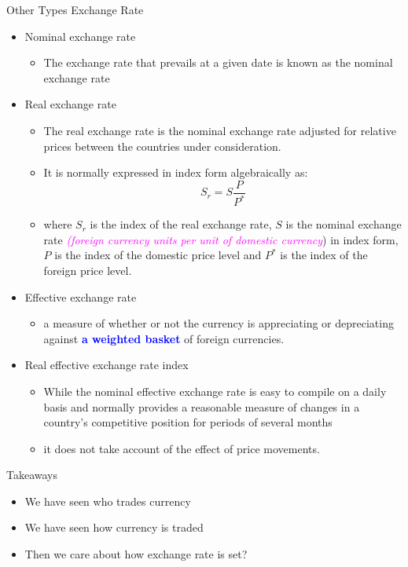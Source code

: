 \documentclass[10pt,hyperref={CJKbookmarks=true},xcolor=dvipsnames,aspectratio=169]{beamer}
\begin{document}
\begin{frame}[allowframebreaks]{Other Types Exchange Rate}

\begin{itemize}
	
	\item Nominal exchange rate
	
	\begin{itemize}
		\item The exchange rate that prevails at a given date is known as the nominal
		exchange rate
	\end{itemize}
	\item Real exchange rate
	
	\begin{itemize}
		\item The real exchange rate is the nominal exchange rate adjusted for relative
		prices between the countries under consideration.
		\item It is normally expressed in index form algebraically as:
		\[
		S_{r}=S\frac{P}{P^{*}}
		\]
		
		\item where $S_{r}$ is the index of the real exchange rate, $S$ is the
		nominal exchange rate \textit{\textcolor{magenta}{(foreign currency
				units per unit of domestic currency}}) in index form, $P$ is the
		index of the domestic price level and $P^{*}$ is the index of the
		foreign price level.
	\end{itemize}
	\item Effective exchange rate
	
	\begin{itemize}
		\item a measure of whether or not the currency is appreciating or depreciating
		against \textbf{\textcolor{blue}{a weighted basket}} of foreign currencies. 
	\end{itemize}
	\item Real effective exchange rate index
	
	\begin{itemize}
		\item While the nominal effective exchange rate is easy to compile on a
		daily basis and normally provides a reasonable measure of changes
		in a country’s competitive position for periods of several months
		\item it does not take account of the effect of price movements. 
	\end{itemize}
	

\end{itemize}
\end{frame}





\begin{frame}{Takeaways}
\begin{itemize}
	\item We have seen who trades currency 
	\item We have seen how currency is traded
	\item Then we care about how exchange rate is set?
\end{itemize}
\end{frame}
\end{document}
